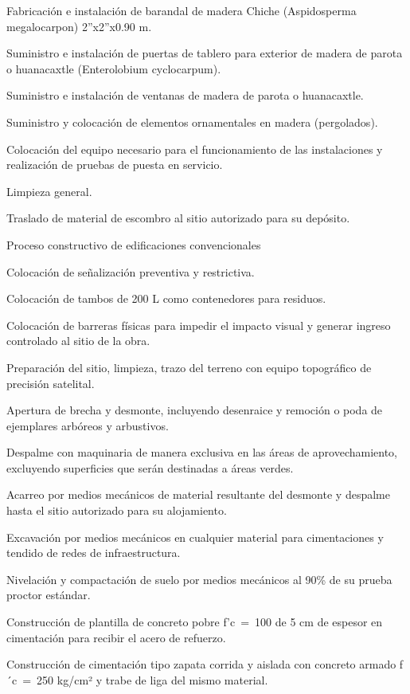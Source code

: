 \documentclass{article}
\begin{document}
Fabricación e instalación de barandal de madera Chiche (Aspidosperma megalocarpon) 2”x2”x0.90 m. 

Suministro e instalación de puertas de tablero para exterior de madera de parota o huanacaxtle (Enterolobium cyclocarpum).

Suministro e instalación de ventanas de madera de parota o huanacaxtle.

Suministro y colocación de elementos ornamentales en madera (pergolados).

Colocación del equipo necesario para el funcionamiento de las instalaciones y realización de pruebas de puesta en servicio.

Limpieza general. 

Traslado de material de escombro al sitio autorizado para su depósito.


\bigskip


\bigskip

Proceso constructivo de edificaciones convencionales


\bigskip

Colocación de señalización preventiva y restrictiva.

Colocación de tambos de 200 L como contenedores para residuos.

Colocación de barreras físicas para impedir el impacto visual y generar ingreso controlado al sitio de la obra.

Preparación del sitio, limpieza, trazo del terreno con equipo topográfico de precisión satelital.

Apertura de brecha y desmonte, incluyendo desenraice y remoción o poda de ejemplares arbóreos y arbustivos.

Despalme con maquinaria de manera exclusiva en las áreas de aprovechamiento, excluyendo superficies que serán destinadas a áreas verdes.

Acarreo por medios mecánicos de material resultante del desmonte y despalme hasta el sitio autorizado para su alojamiento.

Excavación por medios mecánicos en cualquier material para cimentaciones y tendido de redes de infraestructura.

Nivelación y compactación de suelo por medios mecánicos al 90\% de su prueba proctor estándar.

Construcción de plantilla de concreto pobre f'c~=~100 de 5 cm de espesor en cimentación para recibir el acero de refuerzo.

Construcción de cimentación tipo zapata corrida y aislada con concreto armado f´c~=~250 kg/cm² y trabe de liga del mismo material.
\end{document}
